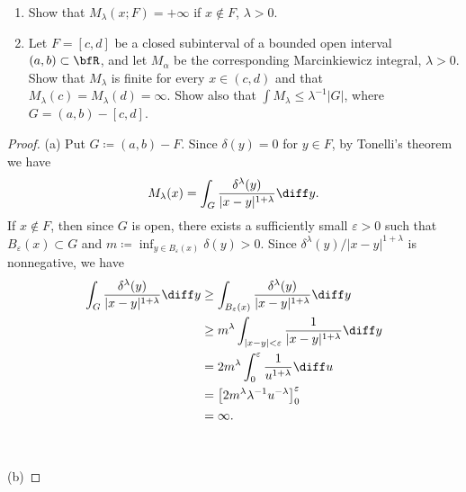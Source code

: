 \begin{problem}
\begin{enumerate}[label=(\alph*)]
\item Show that $M_\lambda(x;F)=+\infty$ if $x\notin F$, $\lambda>0$.
\item Let $F=[c,d]$ be a closed subinterval of a bounded open interval
  $(a,b)\subset\bfR$, and let $M_\alpha$ be the corresponding
  Marcinkiewicz integral, $\lambda>0$. Show that $M_\lambda$ is finite for
  every $x\in(c,d)$ and that $M_\lambda(c)=M_\lambda(d)=\infty$. Show also
  that $\int M_\lambda\leq\lambda^{-1}|G|$, where $G=(a,b)-[c,d]$.
\end{enumerate}
\end{problem}
\begin{proof}
(a) Put $G\coloneqq(a,b)\minus F$. Since $\delta(y)=0$ for $y\in F$, by
Tonelli's theorem we have
\begin{equation}
  \label{eq:application-of-tonelli-2}
M_\lambda(x)=\int_G\frac{\delta^\lambda(y)}{|x-y|^{1+\lambda}}\diff y.
\end{equation}
If $x\notin F$, then since $G$ is open, there exists a sufficiently small
$\varepsilon>0$ such that $B_\varepsilon(x)\subset G$ and
$m\coloneqq\inf_{y\in B_\varepsilon(x)}\delta(y)>0$. Since
$\delta^\lambda(y)/|x-y|^{1+\lambda}$ is nonnegative, we have
\begin{align*}
\int_G\frac{\delta^\lambda(y)}{|x-y|^{1+\lambda}}\diff y
&\geq
  \int_{B_\varepsilon(x)}\frac{\delta^\lambda(y)}{|x-y|^{1+\lambda}}\diff
  y\\
&\geq m^\lambda\int_{|x-y|<\varepsilon}\frac{1}{|x-y|^{1+\lambda}}\diff y\\
&=2m^\lambda\int_0^\varepsilon\frac{1}{u^{1+\lambda}}\diff u\\
&=\left[2m^\lambda\lambda^{-1}u^{-\lambda}\right]_0^\varepsilon\\
&=\infty.
\end{align*}
\\\\
(b)
\end{proof}


